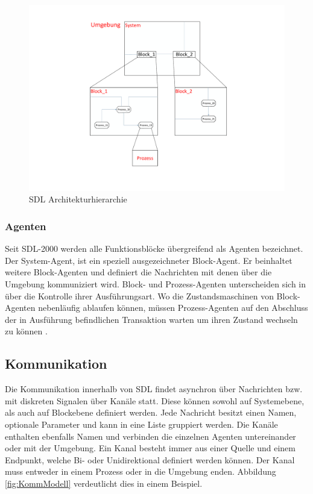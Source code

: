 \begin{figure}[h]
	\centering
	\includegraphics[width=1\textwidth]{Graphics/Agenten.pdf}
	\caption{SDL Architekturhierarchie}
	\label{fig:Agenten}
\end{figure}

\subsubsection{Agenten}
Seit \ac{SDL}-2000 werden alle Funktionsblöcke übergreifend als Agenten bezeichnet. Der System-Agent, ist ein speziell ausgezeichneter Block-Agent. Er beinhaltet weitere Block-Agenten und definiert die Nachrichten mit denen über die Umgebung kommuniziert wird. Block- und Prozess-Agenten unterscheiden sich in über die Kontrolle ihrer Ausführungsart. Wo die Zustandsmaschinen von Block-Agenten nebenläufig ablaufen können, müssen Prozess-Agenten auf den Abschluss der in Ausführung befindlichen Transaktion warten um ihren Zustand wechseln zu können \cite[3]{ITUT100_2016}.


\subsection{Kommunikation}
\label{ssc:Kommunikation}
Die Kommunikation innerhalb von \ac{SDL} findet asynchron über Nachrichten bzw. mit diskreten Signalen über Kanäle statt. 
Diese können sowohl auf Systemebene, als auch auf Blockebene definiert werden.
Jede Nachricht besitzt einen Namen, optionale Parameter und kann in eine Liste gruppiert werden. 
Die Kanäle enthalten ebenfalls Namen und verbinden die einzelnen Agenten untereinander oder mit der Umgebung.
Ein Kanal besteht immer aus einer Quelle und einem Endpunkt, welche Bi- oder Unidirektional definiert werden können. Der Kanal muss entweder in einem Prozess oder in die Umgebung enden.
Abbildung \ref{fig:KommModell} verdeutlicht dies in einem Beispiel.
 
